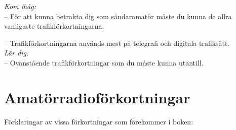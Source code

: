 \noindent\emph{Kom ihåg:}\\

-- För att kunna betrakta dig som sändaramatör måste du kunna de allra
vanligaste trafikförkortningarna.

-- Trafikförkortningarna används mest på telegrafi och digitala
trafiksätt.\\

\noindent\emph{Lär dig:}\\

-- Ovanstående trafikförkortningar som du måste kunna utantill.

\section{Amatörradioförkortningar}

Förklaringar av vissa förkortningar som förekommer i boken:

